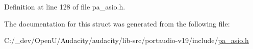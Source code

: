 Definition at line 128 of file pa\+\_\+asio.\+h.



The documentation for this struct was generated from the following file\+:\begin{DoxyCompactItemize}
\item 
C\+:/\+\_\+dev/\+Open\+U/\+Audacity/audacity/lib-\/src/portaudio-\/v19/include/\hyperlink{pa__asio_8h}{pa\+\_\+asio.\+h}\end{DoxyCompactItemize}
